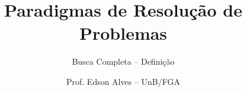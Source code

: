 \title{Paradigmas de Resolução de Problemas}
\subtitle{Busca Completa -- Definição}
\author{Prof. Edson Alves -- UnB/FGA}
\date{}
